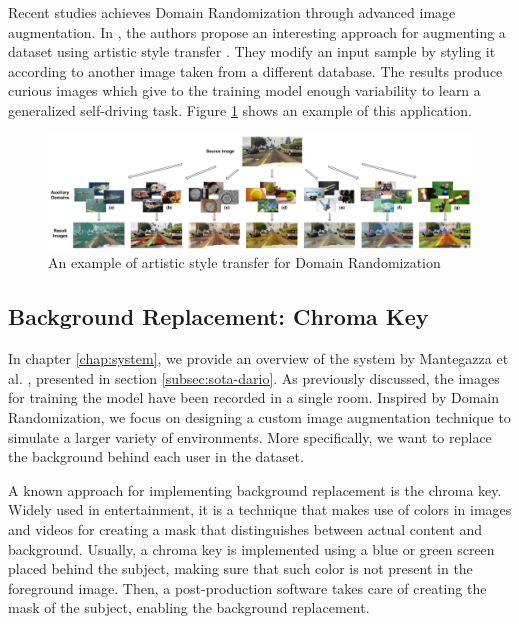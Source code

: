 Recent studies achieves Domain Randomization through advanced image augmentation. In \cite{yue2019domain}, the authors propose an interesting approach for augmenting a dataset using artistic style transfer \cite{gatys2015neural}. They modify an input sample by styling it according to another image taken from a different database. The results produce curious images which give to the training model enough variability to learn a generalized self-driving task. Figure \ref{fig:02-domain-artistic} shows an example of this application.

\begin{figure}[!h]
    \centering
    \includegraphics[width=1\textwidth]{"contents/images/02-domain-artistic"}
    \caption[An example of artistic style transfer for Domain Randomization]{An example of artistic style transfer for Domain Randomization \cite{yue2019domain}}
    \label{fig:02-domain-artistic}
\end{figure}



\subsection{Background Replacement: Chroma Key}
\label{subsec:chromakey}

In chapter \ref{chap:system}, we provide an overview of the system by Mantegazza et al. \cite{mantegazza2019visionbased}, presented in section \ref{subsec:sota-dario}. As previously discussed, the images for training the model have been recorded in a single room. Inspired by Domain Randomization, we focus on designing a custom image augmentation technique to simulate a larger variety of environments. More specifically, we want to replace the background behind each user in the dataset.

A known approach for implementing background replacement is the chroma key. Widely used in entertainment, it is a technique that makes use of colors in images and videos for creating a mask that distinguishes between actual content and background. Usually, a chroma key is implemented using a blue or green screen placed behind the subject, making sure that such color is not present in the foreground image. Then, a post-production software takes care of creating the mask of the subject, enabling the background replacement.

